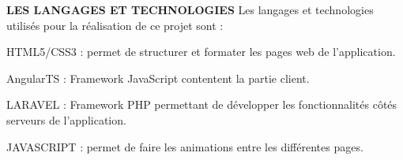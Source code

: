  \textbf{LES LANGAGES ET TECHNOLOGIES}
Les langages et technologies utilisés pour la réalisation de ce projet sont :
\begin{list}{•}{ }
\item HTML5/CSS3 : permet de structurer et formater les pages web de l’application.
\item AngularTS : Framework JavaScript contentent la partie client.
\item LARAVEL : Framework PHP permettant de développer les fonctionnalités côtés serveurs de l’application.
\item JAVASCRIPT : permet de faire les animations entre les différentes pages.
\end{list}
